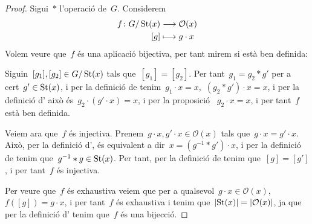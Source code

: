 \documentclass[../../main.tex]{subfiles}
\begin{document}
    \begin{proof}
        Sigui~\(\ast\) l'operació de~\(G\).
        Considerem
        \begin{align*}
        f\colon G/\operatorname{St}(x)&\longrightarrow\mathcal{O}(x)\\
        [g]&\longmapsto g\cdot x
        \end{align*}
        Volem veure que~\(f\) és una aplicació bijectiva, per tant mirem si està ben definida:

        Siguin~\([g_{1}],[g_{2}]\in G/\operatorname{St}(x)\) tals que~\([g_{1}]=[g_{2}]\).
        Per tant~\(g_{1}=g_{2}\ast g'\) per a cert~\(g'\in\operatorname{St}(x)\), i per la definició de  tenim~\(g_{1}\cdot x=x\),~\((g_{2}\ast g')\cdot x=x\), i per la definició d' això és~\(g_{2}\cdot(g'\cdot x)=x\), i per la proposició ~\(g_{2}\cdot x=x\), i per tant~\(f\) està ben definida.

        Veiem ara que~\(f\) és injectiva.
        Prenem~\(g\cdot x,g'\cdot x\in\mathcal{O}(x)\) tals que~\(g\cdot x=g'\cdot x\).
        Això, per la definició d', és equivalent a dir~\(x=(g^{-1}\ast g')\cdot x\), i per la definició de  tenim que~\(g^{-1}\ast g\in\operatorname{St}(x)\).
        Per tant, per la definició de  tenim que~\([g]=[g']\), i per tant~\(f\) és injectiva.

        Per veure que~\(f\) és exhaustiva veiem que per a qualsevol~\(g\cdot x\in\mathcal{O}(x)\),~\(f([g])=g\cdot x\), i per tant~\(f\) és exhaustiva i tenim que~\(\abs{\St(x)}=\abs{\mathcal{O}(x)}\), ja que per la definició d' tenim que~\(f\) és una bijecció.
    \end{proof}
\end{document}
